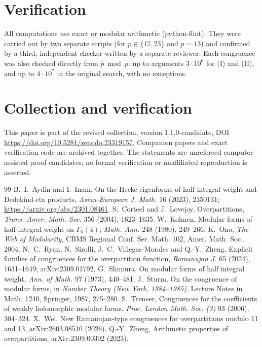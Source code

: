 \documentclass[11pt]{article}
\theoremstyle{remark}\newtheorem{remark}[theorem]{Remark}
\newcommand{\pb}{\overline{p}}
\begin{document}
\section{Verification}
All computations use exact or modular arithmetic (python-flint). They were carried out by two separate scripts (for $p\in\{17,23\}$ and $p=13$) and confirmed by a third, independent checker written by a separate reviewer. Each congruence was also checked directly from $\pb\bmod p$: up to arguments $3\cdot10^6$ for (I) and (II), and up to $4\cdot10^7$ in the original search, with no exceptions.

\section*{Collection and verification}
This paper is part of the revised collection, version 1.1.0-candidate, DOI \url{https://doi.org/10.5281/zenodo.23319157}. Companion papers and exact verification code are archived together. The statements are unrefereed computer-assisted proof candidates; no formal verification or unaffiliated reproduction is asserted.

\begin{thebibliography}{99}
 B.~I.~Aydin and I.~Inam, On the Hecke eigenforms of half-integral weight and Dedekind-eta products, \emph{Asian-European J. Math.} 16 (2023), 2350131; \url{https://arxiv.org/abs/2301.08461}.
 S.~Corteel and J.~Lovejoy, Overpartitions, \emph{Trans. Amer. Math. Soc.} 356 (2004), 1623--1635.
 W.~Kohnen, Modular forms of half-integral weight on $\Gamma_0(4)$, \emph{Math. Ann.} 248 (1980), 249--266.
 K.~Ono, \emph{The Web of Modularity}, CBMS Regional Conf. Ser. Math. 102, Amer. Math. Soc., 2004.
 N.~C.~Ryan, N.~Sirolli, J.~C.~Villegas-Morales and Q.-Y.~Zheng, Explicit families of congruences for the overpartition function, \emph{Ramanujan J.} 65 (2024), 1631--1649; arXiv:2309.01792.
 G.~Shimura, On modular forms of half integral weight, \emph{Ann. of Math.} 97 (1973), 440--481.
 J.~Sturm, On the congruence of modular forms, in \emph{Number Theory (New York, 1984--1985)}, Lecture Notes in Math. 1240, Springer, 1987, 275--280.
 S.~Treneer, Congruences for the coefficients of weakly holomorphic modular forms, \emph{Proc. London Math. Soc. (3)} 93 (2006), 304--324.
 X.~Wei, New Ramanujan-type congruences for overpartitions modulo 11 and 13, arXiv:2603.08510 (2026).
 Q.-Y.~Zheng, Arithmetic properties of overpartitions, arXiv:2309.00302 (2023).
\end{thebibliography}
\end{document}
